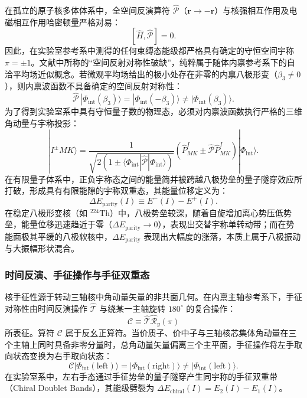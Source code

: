 在孤立的原子核多体体系中，全空间反演算符 $\hat{\mathcal{P}}$（$\mathbf{r} \to -\mathbf{r}$）与核强相互作用及电磁相互作用哈密顿量严格对易：
\begin{equation}\label{eq:4-5-parity-commute}
[\hat{H}, \hat{\mathcal{P}}] = 0.
\end{equation}
因此，在实验室参考系中测得的任何束缚态能级都严格具有确定的守恒空间宇称 $\pi = \pm 1$。文献中所称的“空间反射对称性破缺”，纯粹属于随体内禀参考系下的自洽平均场近似概念。若微观平均场给出的极小处存在非零的内禀八极形变（$\beta_3 \neq 0$），则内禀波函数不具备确定的空间反射对称性：
\begin{equation}\label{eq:4-5-intrinsic-parity-breaking}
\hat{\mathcal{P}}\,|\Phi_{\mathrm{int}}(\beta_3)\rangle = |\Phi_{\mathrm{int}}(-\beta_3)\rangle \neq |\Phi_{\mathrm{int}}(\beta_3)\rangle .
\end{equation}
为了得到实验室系中具有守恒量子数的物理态，必须对内禀波函数执行严格的三维角动量与宇称投影：
\begin{equation}\label{eq:4-5-parity-projection}
|I^\pm M K\rangle = \frac{1}{\sqrt{2(1 \pm \langle \Phi_{\mathrm{int}} | \hat{\mathcal{P}} | \Phi_{\mathrm{int}} \rangle)}} \left( \hat{P}_{MK}^I \pm \hat{\mathcal{P}} \hat{P}_{MK}^I \right) |\Phi_{\mathrm{int}}\rangle .
\end{equation}
在有限量子体系中，正负宇称态之间的能量简并被跨越八极势垒的量子隧穿效应所打破，形成具有有限能隙的宇称双重态，其能量位移定义为：
\begin{equation}\label{eq:4-5-parity-gap}
\Delta E_{\text{parity}}(I) \equiv E^-(I) - E^+(I).
\end{equation}
在稳定八极形变核（如 $^{224}\mathrm{Th}$）中，八极势垒较深，随着自旋增加离心势压低势垒，能量位移迅速趋近于零（$\Delta E_{\text{parity}} \to 0$），表现出交替宇称单转动带；而在势能面极其平缓的八极软核中，$\Delta E_{\text{parity}}$ 表现出大幅度的涨落，本质上属于八极振动与大振幅形状混合。

\subsubsection{时间反演、手征操作与手征双重态}

核手征性源于转动三轴核中角动量矢量的非共面几何。在内禀主轴参考系下，手征对称性由时间反演操作 $\hat{\mathcal{T}}$ 与绕某一主轴旋转 $180^\circ$ 的复合操作：
\begin{equation}\label{eq:4-5-chiral-op}
\mathcal{C} \equiv \hat{\mathcal{T}} \hat{\mathcal{R}}_y(\pi)
\end{equation}
所表征。算符 $\mathcal{C}$ 属于反幺正算符。当价质子、价中子与三轴核芯集体角动量在三个主轴上同时具备非零分量时，总角动量矢量偏离三个主平面，手征操作将左手取向状态变换为右手取向状态：
\begin{equation}\label{eq:4-5-chiral-breaking}
\mathcal{C} |\Phi_{\mathrm{int}}(\text{left})\rangle = |\Phi_{\mathrm{int}}(\text{right})\rangle \neq |\Phi_{\mathrm{int}}(\text{left})\rangle .
\end{equation}
在实验室系中，左右手态通过手征势垒的量子隧穿产生同宇称的手征双重带（Chiral Doublet Bands），其能级劈裂为 $\Delta E_{\text{chiral}}(I) = E_2(I) - E_1(I)$。

